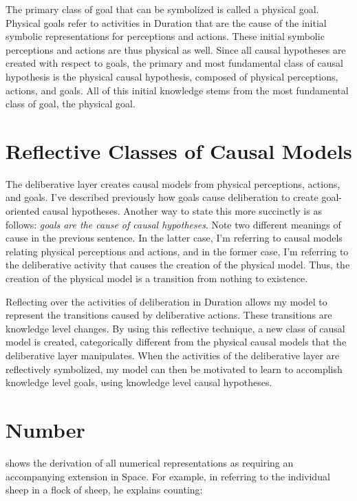 The primary class of goal that can be symbolized is called a physical
goal.  Physical goals refer to activities in Duration that are the
cause of the initial symbolic representations for perceptions and
actions.  These initial symbolic perceptions and actions are thus
physical as well.  Since all causal hypotheses are created with
respect to goals, the primary and most fundamental class of causal
hypothesis is the physical causal hypothesis, composed of physical
perceptions, actions, and goals.  All of this initial knowledge stems
from the most fundamental class of goal, the physical goal.

\section{Reflective Classes of Causal Models}

The deliberative layer creates causal models from physical
perceptions, actions, and goals.  I've described previously how goals
cause deliberation to create goal-oriented causal hypotheses.  Another
way to state this more succinctly is as follows: \emph{goals are the
  cause of causal hypotheses}.  Note two different meanings of cause
in the previous sentence.  In the latter case, I'm referring to causal
models relating physical perceptions and actions, and in the former
case, I'm referring to the deliberative activity that causes the
creation of the physical model.  Thus, the creation of the physical
model is a transition from nothing to existence.

Reflecting over the activities of deliberation in Duration allows my
model to represent the transitions caused by deliberative actions.
These transitions are knowledge level changes.  By using this
reflective technique, a new class of causal model is created,
categorically different from the physical causal models that the
deliberative layer manipulates.  When the activities of the
deliberative layer are reflectively symbolized, my model can then be
motivated to learn to accomplish knowledge level goals, using
knowledge level causal hypotheses.

\section{Number}
\label{section:number}

\cite{bergson:1910} shows the derivation of all numerical
representations as requiring an accompanying extension in Space.  For
example, in referring to the individual sheep in a flock of sheep, he
explains counting:

